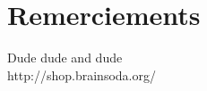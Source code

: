 \backmatter

\chapter*{\center \huge Remerciements}

\begin{thebibliography}{99}
  
Dude dude and dude \\
http://shop.brainsoda.org/
 
\end{thebibliography}
 

